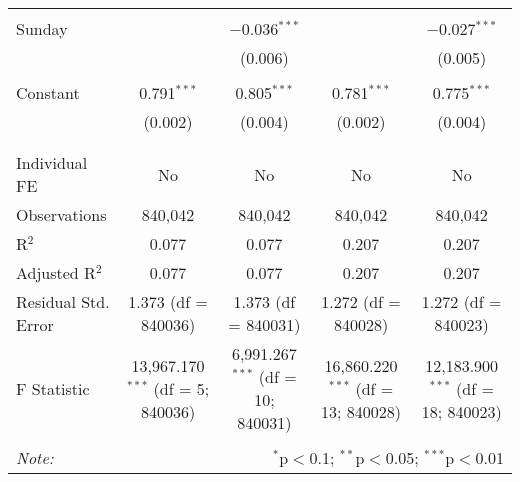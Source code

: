 \documentclass[
]{article}
\begin{document}
\begin{table}[!htbp]
{\begin{tabular}{@{\extracolsep{5pt}}lcccc}
  & & & & \\ 
 Sunday &  & $-$0.036$^{***}$ &  & $-$0.027$^{***}$ \\ 
  &  & (0.006) &  & (0.005) \\ 
  & & & & \\ 
 Constant & 0.791$^{***}$ & 0.805$^{***}$ & 0.781$^{***}$ & 0.775$^{***}$ \\ 
  & (0.002) & (0.004) & (0.002) & (0.004) \\ 
  & & & & \\ 
\hline \\[-1.8ex] 
Individual FE & No & No & No & No \\ 
Observations & 840,042 & 840,042 & 840,042 & 840,042 \\ 
R$^{2}$ & 0.077 & 0.077 & 0.207 & 0.207 \\ 
Adjusted R$^{2}$ & 0.077 & 0.077 & 0.207 & 0.207 \\ 
Residual Std. Error & 1.373 (df = 840036) & 1.373 (df = 840031) & 1.272 (df = 840028) & 1.272 (df = 840023) \\ 
F Statistic & 13,967.170$^{***}$ (df = 5; 840036) & 6,991.267$^{***}$ (df = 10; 840031) & 16,860.220$^{***}$ (df = 13; 840028) & 12,183.900$^{***}$ (df = 18; 840023) \\ 
\hline 
\hline \\[-1.8ex] 
\textit{Note:}  & \multicolumn{4}{r}{$^{*}$p$<$0.1; $^{**}$p$<$0.05; $^{***}$p$<$0.01} \\ 
\end{tabular}
} 
\end{table} 
\newpage
\end{document}
